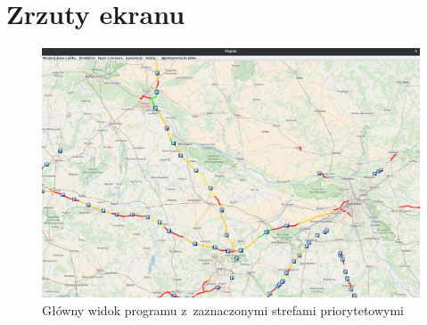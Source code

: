 \section{Zrzuty ekranu}
\begin{figure}
  \centering
  \includegraphics[width=\textwidth]{images/mopnik/widok_glowny.png}
  \caption{Główny widok programu z~zaznaczonymi strefami priorytetowymi}
\end{figure}
